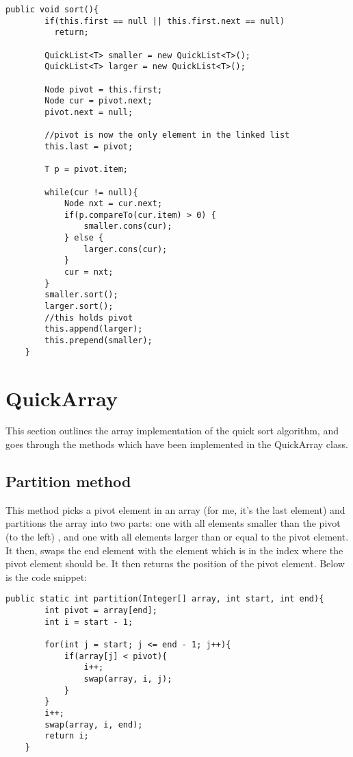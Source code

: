 \documentclass[a4paper,11pt]{article}
\begin{document}
\begin{verbatim}
public void sort(){
        if(this.first == null || this.first.next == null)
          return;

        QuickList<T> smaller = new QuickList<T>();
        QuickList<T> larger = new QuickList<T>();

        Node pivot = this.first;
        Node cur = pivot.next;
        pivot.next = null;

        //pivot is now the only element in the linked list
        this.last = pivot;

        T p = pivot.item;

        while(cur != null){
            Node nxt = cur.next;
            if(p.compareTo(cur.item) > 0) {
                smaller.cons(cur);
            } else {
                larger.cons(cur);
            }
            cur = nxt;
        }
        smaller.sort();
        larger.sort();
        //this holds pivot
        this.append(larger);
        this.prepend(smaller);
    }
\end{verbatim}

\section*{QuickArray}
This section outlines the array implementation of the quick sort algorithm, and goes through the methods which have been implemented in the QuickArray class.

\subsection*{Partition method}
This method picks a pivot element in an array (for me, it's the last element) and partitions the array into two parts: one with all elements smaller than the pivot (to the left) , and one with all elements larger than or equal to the pivot element. It then, swaps the end element with the element which is in the index where the pivot element should be. It then returns the position of the pivot element. Below is the code snippet:

\begin{verbatim}
public static int partition(Integer[] array, int start, int end){
        int pivot = array[end];
        int i = start - 1;

        for(int j = start; j <= end - 1; j++){
            if(array[j] < pivot){
                i++;
                swap(array, i, j);
            }
        }
        i++;
        swap(array, i, end);
        return i;
    }
\end{verbatim}
\end{document}
